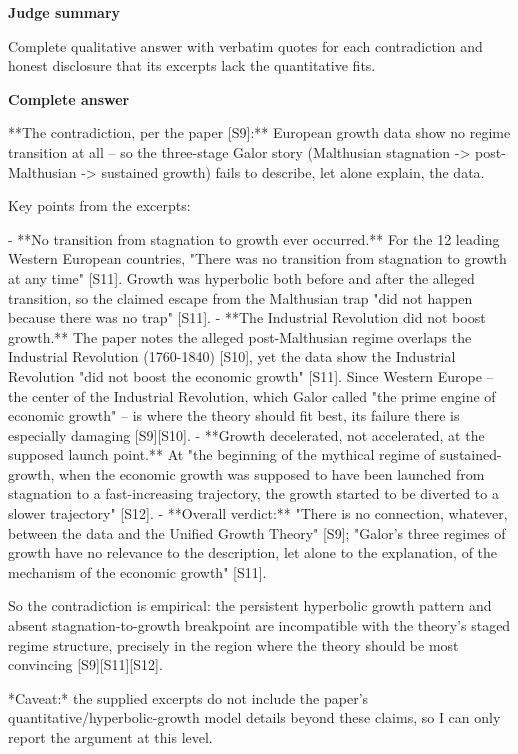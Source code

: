 \documentclass[10pt]{article}
\begin{document}
\textbf{Judge summary}
\begin{EvidenceText}
Complete qualitative answer with verbatim quotes for each contradiction and honest disclosure that its excerpts lack the quantitative fits.
\end{EvidenceText}

\textbf{Complete answer}
\begin{AnswerText}
**The contradiction, per the paper [S9]:** European growth data show no regime transition at all -- so the three-stage Galor story (Malthusian stagnation -> post-Malthusian -> sustained growth) fails to describe, let alone explain, the data.

Key points from the excerpts:

- **No transition from stagnation to growth ever occurred.** For the 12 leading Western European countries, "There was no transition from stagnation to growth at any time" [S11]. Growth was hyperbolic both before and after the alleged transition, so the claimed escape from the Malthusian trap "did not happen because there was no trap" [S11].
- **The Industrial Revolution did not boost growth.** The paper notes the alleged post-Malthusian regime overlaps the Industrial Revolution (1760-1840) [S10], yet the data show the Industrial Revolution "did not boost the economic growth" [S11]. Since Western Europe -- the center of the Industrial Revolution, which Galor called "the prime engine of economic growth" -- is where the theory should fit best, its failure there is especially damaging [S9][S10].
- **Growth decelerated, not accelerated, at the supposed launch point.** At "the beginning of the mythical regime of sustained-growth, when the economic growth was supposed to have been launched from stagnation to a fast-increasing trajectory, the growth started to be diverted to a slower trajectory" [S12].
- **Overall verdict:** "There is no connection, whatever, between the data and the Unified Growth Theory" [S9]; "Galor's three regimes of growth have no relevance to the description, let alone to the explanation, of the mechanism of the economic growth" [S11].

So the contradiction is empirical: the persistent hyperbolic growth pattern and absent stagnation-to-growth breakpoint are incompatible with the theory's staged regime structure, precisely in the region where the theory should be most convincing [S9][S11][S12].

*Caveat:* the supplied excerpts do not include the paper's quantitative/hyperbolic-growth model details beyond these claims, so I can only report the argument at this level.
\end{AnswerText}
\end{document}
